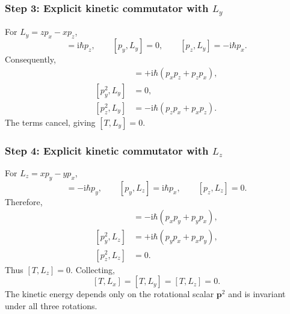 \documentclass[11pt,a4paper]{article}
\newcommand{\iu}{\mathrm{i}}
\begin{document}
\subsubsection*{Step 3: Explicit kinetic commutator with \texorpdfstring{$L_y$}{Ly}}
For \(L_y=zp_x-xp_z\),
\begin{equation}[p_x,L_y]=\iu\hbar p_z,\qquad[p_y,L_y]=0,\qquad[p_z,L_y]=-\iu\hbar p_x.\end{equation}
Consequently,
\begin{align}
[p_x^2,L_y]&=+\iu\hbar(p_xp_z+p_zp_x),\\
[p_y^2,L_y]&=0,\\
[p_z^2,L_y]&=-\iu\hbar(p_zp_x+p_xp_z).
\end{align}
The terms cancel, giving \(\boxed{[T,L_y]=0}\).

\subsubsection*{Step 4: Explicit kinetic commutator with \texorpdfstring{$L_z$}{Lz}}
For \(L_z=xp_y-yp_x\),
\begin{equation}[p_x,L_z]=-\iu\hbar p_y,\qquad[p_y,L_z]=\iu\hbar p_x,\qquad[p_z,L_z]=0.\end{equation}
Therefore,
\begin{align}
[p_x^2,L_z]&=-\iu\hbar(p_xp_y+p_yp_x),\\
[p_y^2,L_z]&=+\iu\hbar(p_yp_x+p_xp_y),\\
[p_z^2,L_z]&=0.
\end{align}
Thus \(\boxed{[T,L_z]=0}\). Collecting,
\begin{equation}\boxed{[T,L_x]=[T,L_y]=[T,L_z]=0.}\end{equation}
The kinetic energy depends only on the rotational scalar \(\mathbf p^2\) and is invariant under all three rotations.
\end{document}
